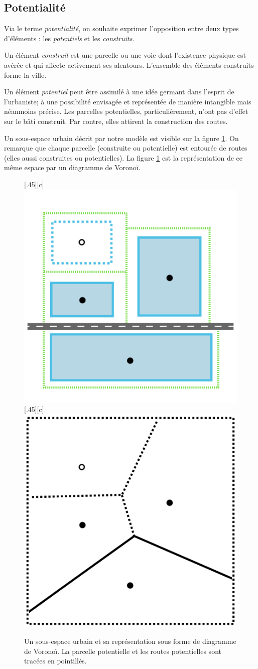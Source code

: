 \documentclass[10pt]{article}
\begin{document}
\subsection{Potentialité}

Via le terme \textit{potentialité}, on souhaite exprimer l'opposition
entre deux types d'éléments : les \textit{potentiels} et les
\textit{construits}.

Un élément \textit{construit} est une parcelle ou une voie dont
l'existence physique est avérée et qui affecte activement ses
alentours. L'ensemble des éléments construits forme la ville.

Un élément \textit{potentiel} peut être assimilé à une idée germant
dans l'esprit de l'urbaniste; à une possibilité envisagée et
représentée de manière intangible mais néanmoins précise. Les
parcelles potentielles, particulièrement, n'ont pas d'effet sur le
bâti construit. Par contre, elles attirent la construction des routes.

Un sous-espace urbain décrit par notre modèle est visible sur la
figure \ref{fig:potential}. On remarque
que chaque parcelle (construite ou potentielle) est entourée de routes
(elles aussi construites ou potentielles). La figure
\ref{fig:potential} est la
représentation de ce même espace par un diagramme de Voronoï.

\begin{figure}[H]
  \centering
  \subcaptionbox{\label{fig:potential-interp}}[.45\linewidth][c]{
    \includegraphics[width=.45\linewidth]{images/potential-interp.png}
  }
  \subcaptionbox{\label{fig:potential-voronoi}}[.45\linewidth][c]{
    \includegraphics[width=.45\linewidth]{images/potential-voronoi.png}
  }
  \caption{Un sous-espace urbain et sa représentation sous forme de
    diagramme de Voronoï. La parcelle potentielle et les routes
    potentielles sont tracées en pointillés.}
  \label{fig:potential}
\end{figure}
\end{document}
